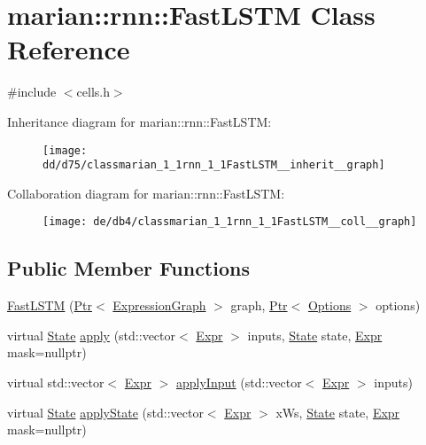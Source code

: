 \hypertarget{classmarian_1_1rnn_1_1FastLSTM}{}\section{marian\+:\+:rnn\+:\+:Fast\+L\+S\+TM Class Reference}
\label{classmarian_1_1rnn_1_1FastLSTM}


{\ttfamily \#include $<$cells.\+h$>$}



Inheritance diagram for marian\+:\+:rnn\+:\+:Fast\+L\+S\+TM\+:
\nopagebreak
\begin{figure}[H]
\begin{center}
\leavevmode
\texttt{[image: dd/d75/classmarian\_1\_1rnn\_1\_1FastLSTM\_\_inherit\_\_graph]}
\end{center}
\end{figure}


Collaboration diagram for marian\+:\+:rnn\+:\+:Fast\+L\+S\+TM\+:
\nopagebreak
\begin{figure}[H]
\begin{center}
\leavevmode
\texttt{[image: de/db4/classmarian\_1\_1rnn\_1\_1FastLSTM\_\_coll\_\_graph]}
\end{center}
\end{figure}
\subsection*{Public Member Functions}
\begin{DoxyCompactItemize}
\item 
\hyperlink{classmarian_1_1rnn_1_1FastLSTM_a86992e0f6dc2d22b32f57d482b2661c0}{Fast\+L\+S\+TM} (\hyperlink{namespacemarian_ad1a373be43a00ef9ce35666145137b08}{Ptr}$<$ \hyperlink{classmarian_1_1ExpressionGraph}{Expression\+Graph} $>$ graph, \hyperlink{namespacemarian_ad1a373be43a00ef9ce35666145137b08}{Ptr}$<$ \hyperlink{classmarian_1_1Options}{Options} $>$ options)
\item 
virtual \hyperlink{structmarian_1_1rnn_1_1State}{State} \hyperlink{classmarian_1_1rnn_1_1FastLSTM_a275238cb651482fac640d18d0a5ed265}{apply} (std\+::vector$<$ \hyperlink{namespacemarian_a498d8baf75b754011078b890b39c8e12}{Expr} $>$ inputs, \hyperlink{structmarian_1_1rnn_1_1State}{State} state, \hyperlink{namespacemarian_a498d8baf75b754011078b890b39c8e12}{Expr} mask=nullptr)
\item 
virtual std\+::vector$<$ \hyperlink{namespacemarian_a498d8baf75b754011078b890b39c8e12}{Expr} $>$ \hyperlink{classmarian_1_1rnn_1_1FastLSTM_ab6b81e03d65d3f49f345ddf14a379b38}{apply\+Input} (std\+::vector$<$ \hyperlink{namespacemarian_a498d8baf75b754011078b890b39c8e12}{Expr} $>$ inputs)
\item 
virtual \hyperlink{structmarian_1_1rnn_1_1State}{State} \hyperlink{classmarian_1_1rnn_1_1FastLSTM_a3d1a86ed6706682489aeaeac9e41ee4e}{apply\+State} (std\+::vector$<$ \hyperlink{namespacemarian_a498d8baf75b754011078b890b39c8e12}{Expr} $>$ x\+Ws, \hyperlink{structmarian_1_1rnn_1_1State}{State} state, \hyperlink{namespacemarian_a498d8baf75b754011078b890b39c8e12}{Expr} mask=nullptr)
\end{DoxyCompactItemize}

